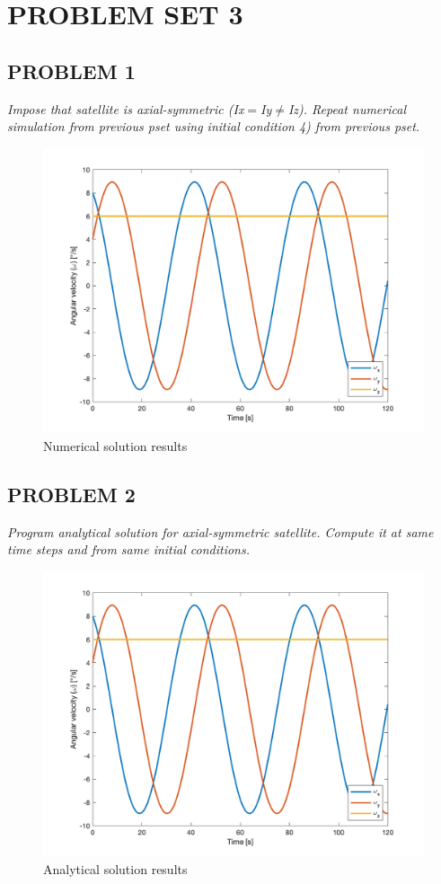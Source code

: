 \section{\Large PROBLEM SET 3}
\subsection{PROBLEM 1}
\textit{Impose that satellite is axial-symmetric (Ix$=$Iy$\neq$Iz). Repeat numerical simulation from previous pset using initial condition 4) from previous pset.}

\begin{figure}[H]
\centering
\includegraphics[scale=0.6]{Images/ps3_problem1.png}
\caption{Numerical solution results}
\label{fig:ps3_problem1}
\end{figure}


\subsection{PROBLEM 2}
\textit{Program analytical solution for axial-symmetric satellite. Compute it at same time steps and from same initial conditions.}

\begin{figure}[H]
\centering
\includegraphics[scale=0.6]{Images/ps3_problem2.png}
\caption{Analytical solution results}
\label{fig:ps3_problem2}
\end{figure}


